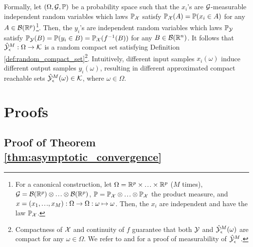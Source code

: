 \documentclass[12pt]{l4dc2022} %
\begin{document}
Formally, let $(\Omega,\mathcal{G},\mathbb{P})$ be a probability space such that the $x_i$'s are $\mathcal{G}$-measurable independent random variables which laws $\mathbb{P}_{\mathcal{X}}$ satisfy  $\mathbb{P}_{\mathcal{X}}(A)=\mathbb{P}(x_i\in A)$ for any $A\in\mathcal{B}(\mathbb{R}^p)$\footnote{For a canonical construction, 
let $
\Omega=\R^p\times\mydots\times\R^p$ ($M$ times), 
$\G=\B(\R^p)\otimes\mydots\otimes\B(\R^p)$,  
$\Prob=\Prob_\X\otimes\mydots\otimes\Prob_\X$ the product measure, and %
% 
$x=(x_1,\mydots,x_M): \Omega\rightarrow\Omega:  \omega\mapsto\omega$. Then, the $x_i$ are independent and have the law $\mathbb{P}_{\mathcal{X}}$.}. %
% 
% 
Then, the $y_i$'s are independent random variables which laws $\mathbb{P}_{\mathcal{Y}}$ satisfy %
$\mathbb{P}_{\mathcal{Y}}(B)=\mathbb{P}(y_i\in B)=\mathbb{P}_{\mathcal{X}}(f^{-1}(B))$ for any $B\in\mathcal{B}(\mathbb{R}^n)$. 
% 
It follows that  
$\hat{\mathcal{Y}}_\epsilon^M:\Omega\rightarrow\mathcal{K}$ is a random compact set satisfying Definition \ref{def:random_compact_set}\footnote{Compactness of $\mathcal{X}$ and continuity of $f$ guarantee that both $\mathcal{Y}$ and $\hat{\mathcal{Y}}_\epsilon^M(\omega)$ are compact for any $\omega\in\Omega$. 
We refer to \citep{Molchanov_BookTheoryOfRandomSets2017} and \citep{LewPavone2020} for a proof of measurability of $\hat{\mathcal{Y}}_\epsilon^M$.}. 
% 
% 
Intuitively, different input samples $x_i(\omega)$  induce different output samples $y_i(\omega)$, resulting in  different approximated compact reachable sets $\hat{\mathcal{Y}}_\epsilon^M(\omega)\in\mathcal{K}$, where  $\omega\in\Omega$.  

% 
% 
% 

\section{Proofs}\label{appendix:proofs}
\subsection{Proof of Theorem \ref{thm:asymptotic_convergence}}\label{apdx:proof:thm:asymptotic_convergence}
\end{document}
